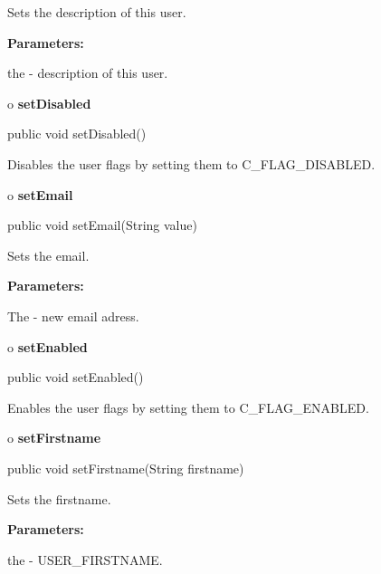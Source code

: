 \begin{description}
\htmlDD Sets the description of this user. 

\begin{description}
\item {\bf Parameters:}  

the - description of this user.  
\end{description}

\end{description}

o {\bf setDisabled} 

\begin{PRE}
 public void setDisabled()
\end{PRE}

\begin{description}
\htmlDD Disables the user flags by setting them to C\_FLAG\_DISABLED. 

\end{description}

o {\bf setEmail} 

\begin{PRE}
 public void setEmail(String value)
\end{PRE}

\begin{description}
\htmlDD Sets the email. 

\begin{description}
\item {\bf Parameters:}  

The - new email adress.  
\end{description}

\end{description}

o {\bf setEnabled} 

\begin{PRE}
 public void setEnabled()
\end{PRE}

\begin{description}
\htmlDD Enables the user flags by setting them to C\_FLAG\_ENABLED. 

\end{description}

o {\bf setFirstname} 

\begin{PRE}
 public void setFirstname(String firstname)
\end{PRE}

\begin{description}
\htmlDD Sets the firstname. 

\begin{description}
\item {\bf Parameters:}  

the - USER\_FIRSTNAME.  
\end{description}

\end{description}

